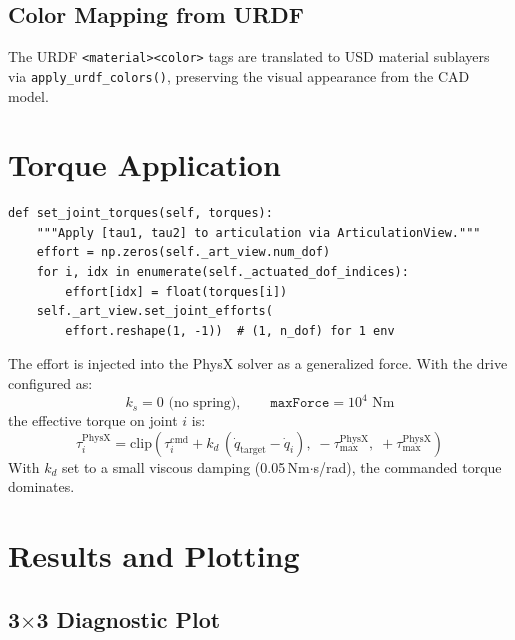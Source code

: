 \documentclass[11pt,a4paper]{article}
\begin{document}
\subsection{Color Mapping from URDF}

The URDF \texttt{<material><color>} tags are translated to USD material sublayers via \texttt{apply\_urdf\_colors()}, preserving the visual appearance from the CAD model.


\section{Torque Application}
\label{sec:torque_apply}

\begin{lstlisting}[caption={Applying torques to PhysX --- \texttt{robots/cup\_manipulator\_tendon\_isaac.py}}]
def set_joint_torques(self, torques):
    """Apply [tau1, tau2] to articulation via ArticulationView."""
    effort = np.zeros(self._art_view.num_dof)
    for i, idx in enumerate(self._actuated_dof_indices):
        effort[idx] = float(torques[i])
    self._art_view.set_joint_efforts(
        effort.reshape(1, -1))  # (1, n_dof) for 1 env
\end{lstlisting}

\begin{codemath}
The effort is injected into the PhysX solver as a generalized force. With the drive configured as:
\[
    k_s = 0 \text{ (no spring)}, \qquad \texttt{maxForce} = 10^4 \text{ Nm}
\]
the effective torque on joint $i$ is:
\[
    \tau_i^{\mathrm{PhysX}} = \mathrm{clip}\!\left(\tau_i^{\mathrm{cmd}} + k_d\,(\dot q_{\mathrm{target}} - \dot q_i),\; -\tau_{\max}^{\mathrm{PhysX}},\; +\tau_{\max}^{\mathrm{PhysX}}\right)
\]
With $k_d$ set to a small viscous damping (0.05\,Nm$\cdot$s/rad), the commanded torque dominates.
\end{codemath}


\section{Results and Plotting}
\label{sec:results}

\subsection{3$\times$3 Diagnostic Plot}
\end{document}
